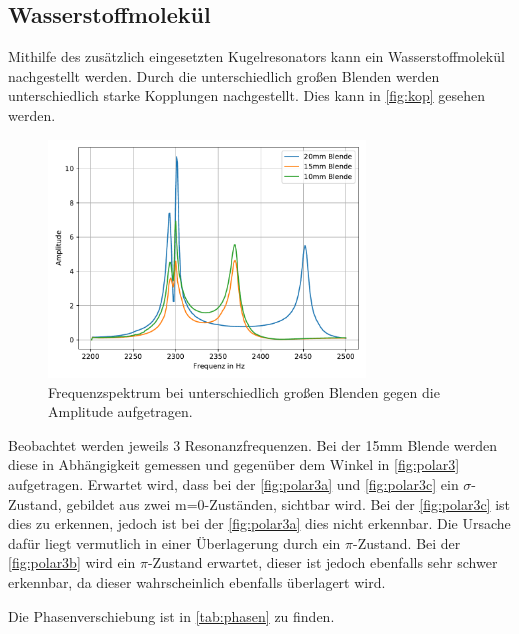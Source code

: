 \subsection{Wasserstoffmolekül}
Mithilfe des zusätzlich eingesetzten Kugelresonators kann ein Wasserstoffmolekül nachgestellt werden. Durch die unterschiedlich großen Blenden werden unterschiedlich
starke Kopplungen nachgestellt. Dies kann in \autoref{fig:kop} gesehen werden. 

\begin{figure}
    \centering
    \includegraphics[width=0.75\textwidth]{pic/101520.pdf}
    \caption{Frequenzspektrum bei unterschiedlich großen Blenden gegen die Amplitude aufgetragen.}
    \label{fig:kop}
  \end{figure}

\noindent
Beobachtet werden jeweils 3 Resonanzfrequenzen. Bei der 15mm Blende  werden diese in Abhängigkeit gemessen und gegenüber dem Winkel in \autoref{fig:polar3} aufgetragen. 
Erwartet wird, dass bei der \autoref{fig:polar3a} und \autoref{fig:polar3c} ein $\sigma$-Zustand, gebildet aus zwei m=0-Zuständen, sichtbar wird. Bei der \autoref{fig:polar3c}
ist dies zu erkennen, jedoch ist bei der \autoref{fig:polar3a} dies nicht erkennbar. Die Ursache dafür liegt vermutlich in einer Überlagerung durch ein $\pi$-Zustand. Bei der 
\autoref{fig:polar3b} wird ein $\pi$-Zustand erwartet, dieser ist jedoch ebenfalls sehr schwer erkennbar, da dieser wahrscheinlich ebenfalls überlagert wird.

\noindent
Die Phasenverschiebung ist in 
\autoref{tab:phasen} zu finden.

